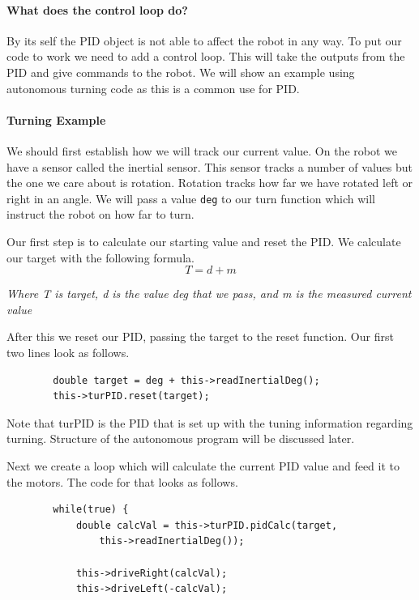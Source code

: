\documentclass[12pt]{report}
\begin{document}
\paragraph{What does the control loop do?}
    By its self the PID object is not able to affect the robot in any way.
    To put our code to work we need to add a control loop.
    This will take the outputs from the PID and give commands to the robot.
    We will show an example using autonomous turning code as this is a common use for PID.

\paragraph{Turning Example}

    We should first establish how we will track our current value. On the robot we have a sensor called the inertial sensor.
    This sensor tracks a number of values but the one we care about is rotation. Rotation tracks how far we have rotated left or right in an angle.
    We will pass a value \verb|deg| to our turn function which will instruct the robot on how far to turn.

    Our first step is to calculate our starting value and reset the PID. We calculate our target with the following formula.
    $$ T = d + m $$
    \begin{center}
     \em{Where T is target, d is the value deg that we pass, and m is the measured current value}
    \end{center}

    After this we reset our PID, passing the target to the reset function.
    Our first two lines look as follows.

    \begin{verbatim}
        double target = deg + this->readInertialDeg();
        this->turPID.reset(target);
    \end{verbatim}

    Note that turPID is the PID that is set up with the tuning information regarding turning.
    Structure of the autonomous program will be discussed later.

    Next we create a loop which will calculate the current PID value and feed it to the motors.
    The code for that looks as follows.

    \begin{verbatim}
        while(true) {
            double calcVal = this->turPID.pidCalc(target,
                this->readInertialDeg());

            this->driveRight(calcVal);
            this->driveLeft(-calcVal);
    \end{verbatim}
\end{document}
